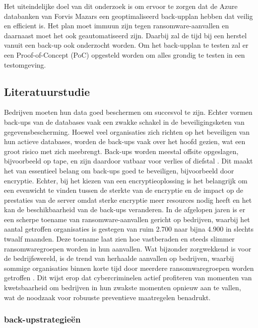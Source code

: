 Het uiteindelijke doel van dit onderzoek is om ervoor te zorgen dat de Azure databanken van Forvis Mazars een geoptimaliseerd back-upplan hebben dat veilig en efficient is. Het plan moet immuun zijn tegen ransomware-aanvallen en daarnaast moet het ook geautomatiseerd zijn. Daarbij zal de tijd bij een herstel vanuit een back-up ook onderzocht worden. Om het back-upplan te testen zal er een Proof-of-Concept (PoC) opgesteld worden om alles grondig te testen in een testomgeving. 


\subsection{Literatuurstudie}%
\label{sec:literatuurstudie}
Bedrijven moeten hun data goed beschermen om succesvol te zijn. Echter vormen back-ups van de databases vaak een zwakke schakel in de beveiligingsketen van gegevensbescherming. Hoewel veel organisaties zich richten op het beveiligen van hun actieve databases, worden de back-ups vaak over het hoofd gezien, wat een groot risico met zich meebrengt. Back-ups worden meestal offsite opgeslagen, bijvoorbeeld op tape, en zijn daardoor vatbaar voor verlies of diefstal \autocite{Cherry2015}. Dit maakt het van essentieel belang om back-ups goed te beveiligen, bijvoorbeeld door encryptie. Echter, bij het kiezen van een encryptieoplossing is het belangrijk om een evenwicht te vinden tussen de sterkte van de encryptie en de impact op de prestaties van de server omdat sterke encryptie meer resources nodig heeft en het kan de beschikbaarheid van de back-ups veranderen. In de afgelopen jaren is er een scherpe toename van ransomware-aanvallen gericht op bedrijven, waarbij het aantal getroffen organisaties is gestegen van ruim 2.700 naar bijna 4.900 in slechts twaalf maanden. Deze toename laat zien hoe vastberaden en steeds slimmer ransomwaregroepen worden in hun aanvallen. Wat bijzonder zorgwekkend is voor de bedrijfswereld, is de trend van herhaalde aanvallen op bedrijven, waarbij sommige organisaties binnen korte tijd door meerdere ransomwaregroepen worden getroffen \autocite{Dikbiyik2024}. Dit wijst erop dat cybercriminelen actief profiteren van momenten van kwetsbaarheid om bedrijven in hun zwakste momenten opnieuw aan te vallen, wat de noodzaak voor robuuste preventieve maatregelen benadrukt.
\subsubsection{back-upstrategieën}%
